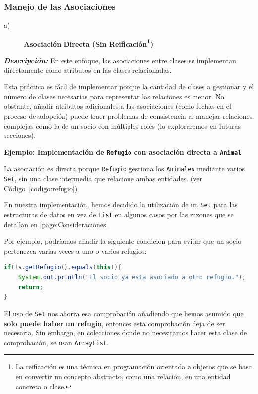 \subsubsection{Manejo de las Asociaciones}

\begin{description}
    \item[a)] \textbf{Asociación Directa (Sin Reificación\footnote{
        La reificación es una técnica en programación 
        orientada a objetos que se basa en convertir un 
        concepto abstracto, como una relación, en una 
        entidad concreta o clase.})}
\end{description}

\textit{\textbf{Descripción:}}  
En este enfoque, las asociaciones entre clases se implementan directamente como atributos 
en las clases relacionadas.\par
\vspace{0.15cm}
Esta práctica es fácil de implementar porque la cantidad de clases a gestionar 
y el número de clases necesarias para representar las relaciones es menor. No obstante, 
añadir atributos adicionales a las asociaciones (como fechas en el proceso 
de adopción) puede traer problemas de consistencia al manejar relaciones complejas como la 
de un socio con múltiples roles (lo exploraremos en futuras secciones).\par
\newpage %
\textbf{Ejemplo: Implementación de \texttt{Refugio} con asociación directa a \texttt{Animal}}\par
La asociación es directa porque \texttt{Refugio} gestiona los \texttt{Animales} mediante varios 
\texttt{Set}, sin una clase intermedia que relacione ambas entidades. (ver Código~\ref{codigo:refugio})\par

En nuestra implementación, hemos decidido la utilización de un \texttt{Set} para las estructuras de datos 
en vez de \texttt{List} en algunos casos por las razones que se detallan en \ref{page:Consideraciones}

Por ejemplo, podríamos añadir la siguiente condición para evitar que un socio pertenezca varias veces a uno o varios refugios:
\begin{lstlisting}[style = javaEspecifico, language=Java]
    if(!s.getRefugio().equals(this)){
    System.out.println("El socio ya esta asociado a otro refugio.");
    return;
}
\end{lstlisting}
El uso de \texttt{Set} nos ahorra esa comprobación añadiendo que hemos asumido que \textbf{solo puede haber un refugio}, entonces esta comprobación deja de ser necesaria. Sin embargo,
en colecciones donde no necesitamos hacer esta clase de comprobación, se usan \texttt{ArrayList}.
\vspace{0.45cm}


